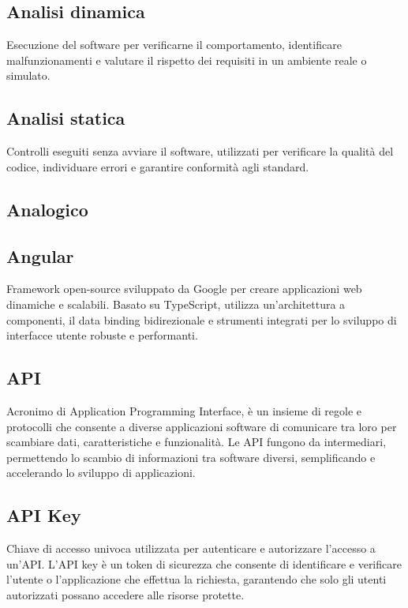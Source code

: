 \hypertarget{sec:analisi_dinamica}{}
\subsection*{Analisi dinamica}
Esecuzione del software per verificarne il comportamento, identificare malfunzionamenti e valutare il rispetto dei requisiti in un ambiente reale o simulato.

\hypertarget{sec:analisi_statica}{}
\subsection*{Analisi statica}
Controlli eseguiti senza avviare il software, utilizzati per verificare la qualità del codice, individuare errori e garantire conformità agli standard.

\hypertarget{sec:analogico}{}
\subsection*{Analogico}

\hypertarget{sec:angular}{}
\subsection*{Angular}
Framework open-source sviluppato da Google per creare applicazioni web dinamiche e scalabili. Basato su TypeScript, utilizza un'architettura a componenti, 
il data binding bidirezionale e strumenti integrati per lo sviluppo di interfacce utente robuste e performanti.

\hypertarget{sec:api}{}
\subsection*{API}
Acronimo di Application Programming Interface, è un insieme di regole e protocolli che consente a diverse applicazioni software di comunicare tra loro 
per scambiare dati, caratteristiche e funzionalità. Le API fungono da intermediari, permettendo lo scambio di informazioni tra software diversi, semplificando 
e accelerando lo sviluppo di applicazioni.

\hypertarget{sec:api_key}{}
\subsection*{API Key}
Chiave di accesso univoca utilizzata per autenticare e autorizzare l'accesso a un'API. L'API key è un token di sicurezza che consente di identificare e
verificare l'utente o l'applicazione che effettua la richiesta, garantendo che solo gli utenti autorizzati possano accedere alle risorse protette.

